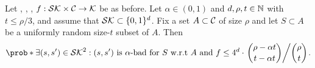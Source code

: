 
\begin{lemma}\label{lemma:equiv}
  Let \setSK, \setC, \keyspace, \(f : \mathcal{SK} \times \mathcal{C} \to \mathcal{K}\) be as before.
  Let \(\alpha \in (0,1)\) and \(d,\rho,t \in \mathbb{N}\) with \(t \le \rho/3\),
  and assume that \(\mathcal{SK} \subset \{0,1\}^{d}\).
  Fix a set \(A \subset \mathcal{C}\) of size \(\rho\)
  and let \(S \subset A\) be a uniformly random size-\(t\) subset of \(A\).
  Then
  \begin{align}\label{ineq:equiv}
    \prob*{\exists (s,s') \in \setSK^{2} : (s,s') \text{ is \(\alpha\)-bad for } S \text{ w.r.t \(A\) and \(f\)}}
    \le 4^{d} \cdot \left. \binom{\rho - \alpha t}{t - \alpha t} \middle/ \binom{\rho}{t} \right..
  \end{align}
\end{lemma}

